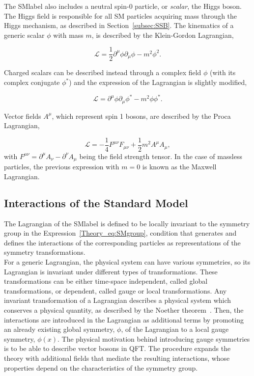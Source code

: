 The \acrshort{SMlabel} also includes a neutral spin-0 particle, or \textit{scalar}, the Higgs boson. The Higgs field is responsible for all SM particles acquiring mass through the Higgs mechanism, as described in Section~\ref{subsec:SSB}.
The kinematics of a generic scalar $\phi$ with mass $m$, is described by the Klein-Gordon Lagrangian,

\begin{equation}
    \label{Theory_eq:KGeq}
    \mathcal{L}=\frac{1}{2}\partial^\mu\phi\partial_\mu\phi - m^2\phi^2.
\end{equation}

Charged scalars can be described instead through a complex field $\phi$ (with its complex conjugate $\phi^*$) and the expression of the Lagrangian is slightly modified,

\begin{equation}
    \label{Theory_eq:KGeqcharged}
    \mathcal{L}=\partial^\mu\phi\partial_\mu\phi^* - m^2\phi\phi^*.
\end{equation}

Vector fields $A^\mu$, which represent spin 1 bosons, are described by the Proca Lagrangian,

\begin{equation}
    \label{Theory_eq:Proca}
    \mathcal{L}=-\frac{1}{4}F^{\mu\nu}F_{\mu\nu}+\frac{1}{2}m^2A^\mu A_\mu,
\end{equation}
with $F^{\mu\nu}=\partial^\mu A_\nu -\partial^\nu A_\mu$ being the field strength tensor.
In the case of massless particles, the previous expression with $m=0$ is known as the Maxwell Lagrangian.

\subsection{Interactions of the Standard Model}
\label{subsec:SMinteractions}
The Lagrangian of the \acrshort{SMlabel} is defined to be locally invariant to the symmetry group in the Expression~\ref{Theory_eq:SMgroup},
condition that generates and defines the interactions of the corresponding particles as representations of the symmetry transformations.\\

For a generic Lagrangian, the physical system can have various symmetries, so its Lagrangian is invariant under different types of transformations.
These transformations can be either time-space independent, called global transformations, or dependent, called gauge or local transformations.
Any invariant transformation of a Lagrangian describes a physical system which conserves a physical quantity, as described by the Noether theorem~\cite{Noether}.
Then, the interactions are introduced in the Lagrangian as additional terms by promoting an already existing global symmetry, $\phi$,
of the Lagrangian to a local gauge symmetry, $\phi(x)$. The physical motivation behind introducing gauge symmetries
is to be able to describe vector bosons in \acrshort{QFT}.
The procedure expands the theory with additional fields that mediate the resulting interactions,
whose properties depend on the characteristics of the symmetry group.\\

